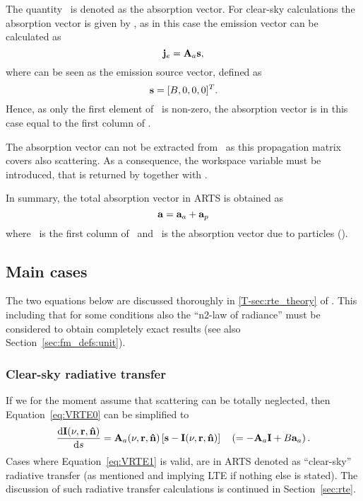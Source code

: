 The quantity \AbsVec\ is denoted as the absorption vector. For clear-sky
calculations the absorption vector is given by , as in this case the
emission vector can be calculated as
\begin{equation}
  \label{eq:evec2}
  \mathbf{j}_e = {\bf A}_{a}\mathbf{s},
\end{equation}
where  can be seen as the emission source vector, defined as
\begin{equation}
  \mathbf{s} = [B,0,0,0]^T.
\end{equation}
Hence, as only the first element of \ is non-zero, the absorption
vector is in this case equal to the first column of .

The absorption vector can not be extracted from \ as this
propagation matrix covers also scattering. As a consequence, the workspace
variable  must be introduced, that is returned by
 together with .

In summary, the total absorption vector in ARTS is obtained as
\begin{equation}
  \label{eq:evec3}
  {\bf a} = {\bf a}_{a} + {\bf a}_{p}
\end{equation}
where \ is the first column of \, and \ is the
absorption vector due to particles ().




\subsection{Main cases}
\label{sec:rteq:cases}
%
The two equations below are discussed thoroughly in \ref{T-sec:rte_theory} of
\theory. This including that for some conditions also the ``n2-law of
radiance'' must be considered to obtain completely exact results (see also
Section~\ref{sec:fm_defs:unit}).

\subsubsection{Clear-sky radiative transfer}
%
If we for the moment assume that scattering can be totally neglected, then
Equation~\ref{eq:VRTE0} can be simplified to
\begin{equation}
  \label{eq:VRTE1}
  \frac{\mathrm{d}{\bf I}(\nu,{\bf r},{\bf \hat{n}})}{\mathrm{d} s} =
  {\bf A}_{a}(\nu,{\bf r},{\bf \hat{n}})\left[ \mathbf{s}- {\bf I}(\nu,{\bf r},{\bf \hat{n}})
  \right] \quad \left( = -{\bf A}_{a}{\bf I} + B{\bf a}_{a}\right).
\end{equation}
Cases where Equation~\ref{eq:VRTE1} is valid, are in ARTS denoted as
``clear-sky'' radiative transfer (as mentioned and implying LTE if nothing else
is stated). The discussion of such radiative transfer calculations is continued
in Section~\ref{sec:rte}. 


